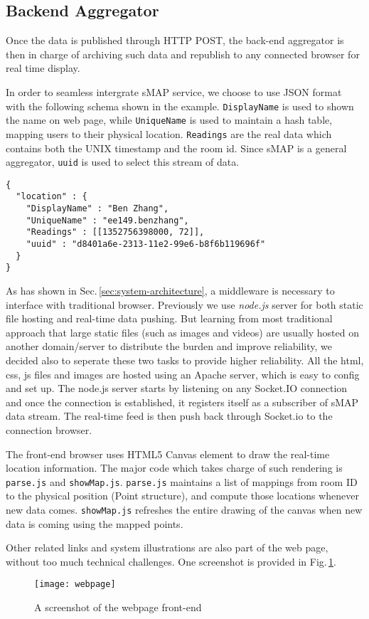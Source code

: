 \subsection{Backend Aggregator}
\label{sec:backend-aggregator}
Once the data is published through HTTP POST, the back-end aggregator is then in charge of archiving such data and republish to any connected browser for real time display. 

In order to seamless intergrate sMAP service, we choose to use JSON format with the following schema shown in the example. \texttt{DisplayName} is used to shown the name on web page, while \texttt{UniqueName} is used to maintain a hash table, mapping users to their physical location. \texttt{Readings} are the real data which contains both the UNIX timestamp and the room id. Since sMAP is a general aggregator, \texttt{uuid} is used to select this stream of data.
\begin{lstlisting}
{
  "location" : {
    "DisplayName" : "Ben Zhang",
    "UniqueName" : "ee149.benzhang",
    "Readings" : [[1352756398000, 72]],
    "uuid" : "d8401a6e-2313-11e2-99e6-b8f6b119696f"
  }
}
\end{lstlisting}

As has shown in Sec.\,\ref{sec:system-architecture}, a middleware is necessary to interface with traditional browser. Previously we use {\em node.js} server for both static file hosting and real-time data pushing. But learning from most traditional approach that large static files (such as images and videos) are usually hosted on another domain/server to distribute the burden and improve reliability, we decided also to seperate these two tasks to provide higher reliability. All the html, css, js files and images are hosted using an Apache server, which is easy to config and set up. The node.js server starts by listening on any Socket.IO connection and once the connection is established, it registers itself as a subscriber of sMAP data stream. The real-time feed is then push back through Socket.io to the connection browser.

The front-end browser uses HTML5 Canvas element to draw the real-time location information. The major code which takes charge of such rendering is \texttt{parse.js} and \texttt{showMap.js}. \texttt{parse.js} maintains a list of mappings from room ID to the physical position (Point structure), and compute those locations whenever new data comes. \texttt{showMap.js} refreshes the entire drawing of the canvas when new data is coming using the mapped points. 

Other related links and system illustrations are also part of the web page, without too much technical challenges. One screenshot is provided in Fig.\,\ref{fig:webpage}.
\begin{figure}
  \centering
  \texttt{[image: webpage]}
  \caption{A screenshot of the webpage front-end}
  \label{fig:webpage}
\end{figure}


